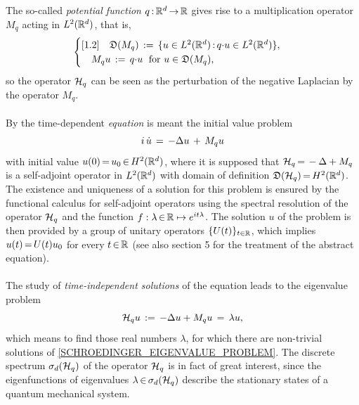 \documentclass[11pt,twoside]{article}
\begin{document}
\begin{itemize}[leftmargin=17pt]
\subparagraph{} %
The so-called \textit{potential function} $q {\,:\,} {\mathbb{R}}^d {\,\to\,} {\mathbb{R}}$
gives rise to a multiplication operator $M_q$ acting in $L^2({\mathbb{R}}^d)$,
that is,
\[
\begin{cases}[1.2]
\quad \mathfrak{D}(M_q) \,:=\, \{u \in L^2({\mathbb{R}}^d) {\,:\,} q {\cdot} u \in L^2({\mathbb{R}}^d)\},\\
\quad M_q u        \,:=\, q {\cdot} u \; \mbox{ for } u \in \mathfrak{D}(M_q)   ,\\
\end{cases}
\]
so the operator ${\mathcal{H}}_q$ can be seen as the perturbation
of the negative Laplacian by the operator $M_q$.

\paragraph{} %
By the time-dependent \textit{{\SCHROEDINGER} equation} is meant
the initial value problem
\[
i \, \dot{u} \,=\, -\Delta u \,+\, M_q u
\]
with initial value $u(0) {\,=\,} u_0 {\,\in\,} H^2({\mathbb{R}}^d)$,
where it is supposed that ${\mathcal{H}}_q {\,=\,} -\Delta + M_q$
is a self-adjoint operator in $L^2({\mathbb{R}}^d)$
with domain of definition $\mathfrak{D}({\mathcal{H}}_q) {\,=\,} H^2({\mathbb{R}}^d)$.
The existence and uniqueness of a solution for this problem is ensured
by the functional calculus for self-adjoint operators
using the spectral resolution of the operator ${\mathcal{H}}_q$
and the function $f:\lambda {\,\in\,} {\mathbb{R}} \mapsto e^{it \lambda}$.
The solution $u$ of the problem is then provided
by a group of unitary operators $\{U(t)\}_{t \in {\mathbb{R}}}$,
which implies $u(t) {\,=\,} U(t) u_0$ for every $t {\,\in\,} {\mathbb{R}}$
(see also section 5 for the treatment of the abstract {\SCHROEDINGER} equation).

\paragraph{} %
The study of \textit{time-independent solutions}
of the {\SCHROEDINGER} equation leads to the eigenvalue problem
\begin{equation}\label{SCHROEDINGER_EIGENVALUE_PROBLEM}
{\mathcal{H}}_q u \,:=\, -\Delta u + M_q u \,=\, \lambda u,
\end{equation}
which means to find those real numbers $\lambda$,
for which there are non-trivial solutions
of \eqref{SCHROEDINGER_EIGENVALUE_PROBLEM}.
The discrete spectrum $\sigma_d({\mathcal{H}}_q)$ of the operator ${\mathcal{H}}_q$
is in fact of great interest,
since the eigen\-functions of eigen\-values $\lambda {\,\in\,} \sigma_d({\mathcal{H}}_q)$
describe the stationary states of a quantum mechanical system.


\end{itemize}
\end{document}
